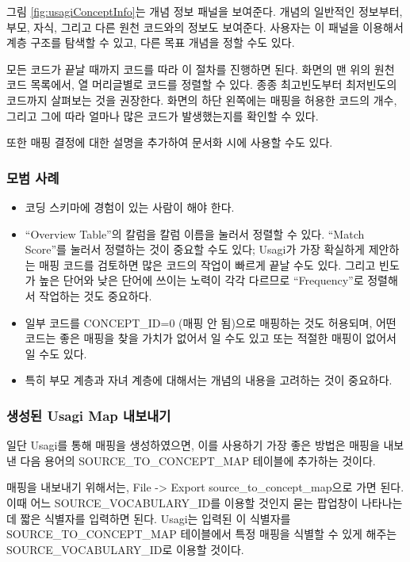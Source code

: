 \documentclass[10.5pt]{book}
\providecommand{\tightlist}{%
  \setlength{\itemsep}{0pt}\setlength{\parskip}{0pt}}
\theoremstyle{definition}
\theoremstyle{definition}
\theoremstyle{definition}
\theoremstyle{remark}
\begin{document}
그림 \ref{fig:usagiConceptInfo}는 개념 정보 패널을 보여준다. 개념의
일반적인 정보부터, 부모, 자식, 그리고 다른 원천 코드와의 정보도
보여준다. 사용자는 이 패널을 이용해서 계층 구조를 탐색할 수 있고, 다른
목표 개념을 정할 수도 있다.

모든 코드가 끝날 때까지 코드를 따라 이 절차를 진행하면 된다. 화면의 맨
위의 원천 코드 목록에서, 열 머리글별로 코드를 정렬할 수 있다. 종종
최고빈도부터 최저빈도의 코드까지 살펴보는 것을 권장한다. 화면의 하단
왼쪽에는 매핑을 허용한 코드의 개수, 그리고 그에 따라 얼마나 많은 코드가
발생했는지를 확인할 수 있다.

또한 매핑 결정에 대한 설명을 추가하여 문서화 시에 사용할 수도 있다.

\subsubsection*{모범 사례}\label{-}

\begin{itemize}
\tightlist
\item
  코딩 스키마에 경험이 있는 사람이 해야 한다.
\item
  ``Overview Table''의 칼럼을 칼럼 이름을 눌러서 정렬할 수 있다. ``Match
  Score''를 눌러서 정렬하는 것이 중요할 수도 있다; Usagi가 가장 확실하게
  제안하는 매핑 코드를 검토하면 많은 코드의 작업이 빠르게 끝날 수도
  있다. 그리고 빈도가 높은 단어와 낮은 단어에 쓰이는 노력이 각각
  다르므로 ``Frequency''로 정렬해서 작업하는 것도 중요하다.
\item
  일부 코드를 CONCEPT\_ID=0 (매핑 안 됨)으로 매핑하는 것도 허용되며,
  어떤 코드는 좋은 매핑을 찾을 가치가 없어서 일 수도 있고 또는 적절한
  매핑이 없어서 일 수도 있다.
\item
  특히 부모 계층과 자녀 계층에 대해서는 개념의 내용을 고려하는 것이
  중요하다.
\end{itemize}

\subsubsection*{생성된 Usagi Map 내보내기}\label{-usagi-map-}

일단 Usagi를 통해 매핑을 생성하였으면, 이를 사용하기 가장 좋은 방법은
매핑을 내보낸 다음 용어의 SOURCE\_TO\_CONCEPT\_MAP 테이블에 추가하는
것이다.

매핑을 내보내기 위해서는, File -\textgreater{} Export
source\_to\_concept\_map으로 가면 된다. 이때 어느
SOURCE\_VOCABULARY\_ID를 이용할 것인지 묻는 팝업창이 나타나는데 짧은
식별자를 입력하면 된다. Usagi는 입력된 이 식별자를
SOURCE\_TO\_CONCEPT\_MAP 테이블에서 특정 매핑을 식별할 수 있게 해주는
SOURCE\_VOCABULARY\_ID로 이용할 것이다.
\end{document}
